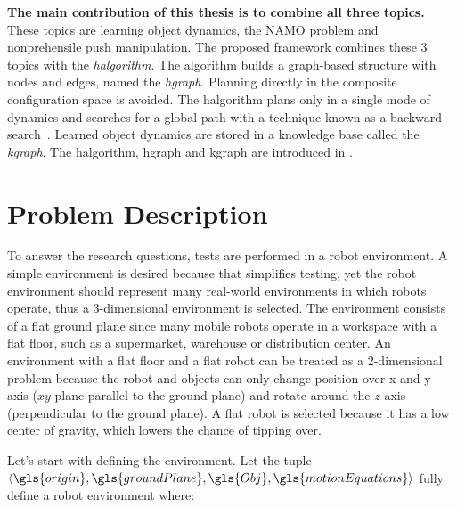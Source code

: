 \textbf{The main contribution of this thesis is to combine all three topics.} These topics are learning object dynamics, the \ac{NAMO} problem and nonprehensile push manipulation. The proposed framework combines these 3 topics with the \textit{\acl{halgorithm}}. The algorithm builds a graph-based structure with nodes and edges, named the \textit{\acl{hgraph}}. Planning directly in the composite configuration space is avoided. The \acl{halgorithm} plans only in a single mode of dynamics and searches for a global path with a technique known as a backward search~\cite{krontiris_dealing_2015}. Learned object dynamics are stored in a knowledge base called the \textit{\acl{kgraph}}. The \ac{halgorithm}, \ac{hgraph} and \ac{kgraph} are introduced in .\bs

\section{Problem Description}%
\label{sec:problem_description}
To answer the research questions, tests are performed in a robot environment. A simple environment is desired because that simplifies testing, yet the robot environment should represent many real-world environments in which robots operate, thus a 3-dimensional environment is selected. The environment consists of a flat ground plane since many mobile robots operate in a workspace with a flat floor, such as a supermarket, warehouse or distribution center. An environment with a flat floor and a flat robot can be treated as a 2-dimensional problem because the robot and objects can only change position over \gls{x} and \gls{y} axis ($xy$ plane parallel to the ground plane) and rotate around the $z$ axis (perpendicular to the ground plane). A flat robot is selected because it has a low center of gravity, which lowers the chance of tipping over.\bs

Let's start with defining the environment. Let the tuple $\left\langle \gls{origin}, \gls{groundPlane}, \gls{Obj}, \gls{motionEquations} \right\rangle$ fully define a robot environment where:\bs

